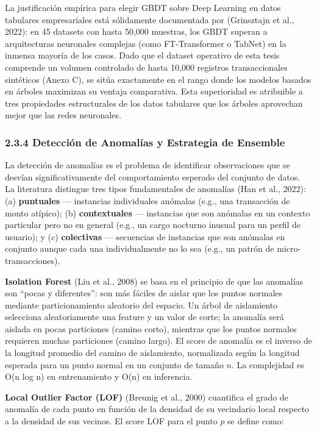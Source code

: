 La justificación empírica para elegir GBDT sobre Deep Learning en datos
tabulares empresariales está sólidamente documentada por (Grinsztajn et
al., 2022): en 45 datasets con hasta 50,000 muestras, los GBDT superan a
arquitecturas neuronales complejas (como FT-Transformer o TabNet) en la
inmensa mayoría de los casos. Dado que el dataset operativo de esta
tesis comprende un volumen controlado de hasta 10,000 registros
transaccionales sintéticos (Anexo C), se sitúa exactamente en el rango
donde los modelos basados en árboles maximizan su ventaja comparativa.
Esta superioridad es atribuible a tres propiedades estructurales de los
datos tabulares que los árboles aprovechan mejor que las redes
neuronales.

\subsubsection{2.3.4 Detección de Anomalías y Estrategia de
Ensemble}\label{detecciuxf3n-de-anomaluxedas-y-estrategia-de-ensemble}

La detección de anomalías es el problema de identificar observaciones
que se desvían significativamente del comportamiento esperado del
conjunto de datos. La literatura distingue tres tipos fundamentales de
anomalías (Han et al., 2022): (a) \textbf{puntuales} --- instancias
individuales anómalas (e.g., una transacción de monto atípico); (b)
\textbf{contextuales} --- instancias que son anómalas en un contexto
particular pero no en general (e.g., un cargo nocturno inusual para un
perfil de usuario); y (c) \textbf{colectivas} --- secuencias de
instancias que son anómalas en conjunto aunque cada una individualmente
no lo sea (e.g., un patrón de micro-transacciones).

\textbf{Isolation Forest} (Liu et al., 2008) se basa en el principio de
que las anomalías son ``pocas y diferentes'': son más fáciles de aislar
que los puntos normales mediante particionamiento aleatorio del espacio.
Un árbol de aislamiento selecciona aleatoriamente una feature y un valor
de corte; la anomalía será aislada en pocas particiones (camino corto),
mientras que los puntos normales requieren muchas particiones (camino
largo). El score de anomalía es el inverso de la longitud promedio del
camino de aislamiento, normalizada según la longitud esperada para un
punto normal en un conjunto de tamaño \(n\). La complejidad es O(n log
n) en entrenamiento y O(n) en inferencia.

\textbf{Local Outlier Factor (LOF)} (Breunig et al., 2000) cuantifica el
grado de anomalía de cada punto en función de la densidad de su
vecindario local respecto a la densidad de sus vecinos. El score LOF
para el punto \(p\) se define como:

